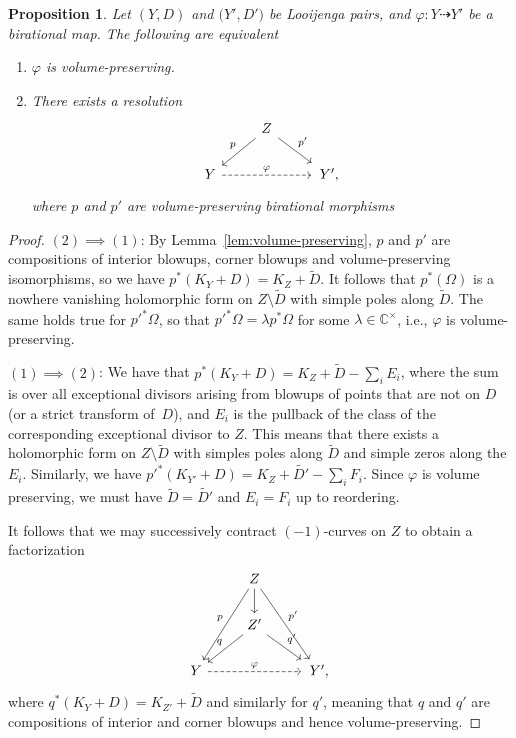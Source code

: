 \documentclass[pdftex]{sigma}
\numberwithin{equation}{section}
\newtheorem{Proposition}[Theorem]{Proposition}
{ \theoremstyle{definition}
	\newtheorem{Definition}[Theorem]{Definition}
	\newtheorem{Note}[Theorem]{Note}
	\newtheorem{Example}[Theorem]{Example}
	\newtheorem{Remark}[Theorem]{Remark} }
\newcommand{\CC}{\mathbb{C}}
\begin{document}
\begin{Proposition}\label{thm:volume-preserving}
Let $(Y, D)$ and $\bigl(Y', D'\bigr)$ be Looijenga pairs, and $\varphi \colon Y \dashrightarrow Y'$ be a birational map. The following are equivalent
	\begin{enumerate}\itemsep=0pt
		\item[$(1)$] $\varphi$ is volume-preserving.
		\item[$(2)$] There exists a resolution
				\[
				\begin{tikzcd}
			&Z \ar[dl, swap, "p"] \ar[dr, "p'"]&\\
			Y \ar[rr, dashed, "\varphi"]&&\,Y',
		\end{tikzcd}
	\]
	where $p$ and $p'$ are volume-preserving birational morphisms

	\end{enumerate}
\end{Proposition}
\begin{proof}
	$(2) \implies (1)$: By Lemma~\ref{lem:volume-preserving}, $p$ and $p'$ are compositions of interior blowups, corner blowups and volume-preserving isomorphisms, so we have $p^*(K_Y+D)=K_{Z}+\tilde{D}$. It follows that $p^*(\Omega)$ is a nowhere vanishing holomorphic form on $Z \setminus \tilde{D}$ with simple poles along $\tilde{D}$. The same holds true for $p'^*\Omega$, so that $p'^*\Omega=\lambda p^*\Omega$ for some $\lambda \in \CC^\times$, i.e., $\varphi$ is volume-preserving.

	$(1) \implies (2)$: We have that $p^*(K_Y+D)=K_Z+\tilde{D}-\sum_i E_i$, where the sum is over all exceptional divisors arising from blowups of points that are not on $D$ (or a strict transform of~$D$), and $E_i$ is the pullback of the class of the corresponding exceptional divisor to $Z$. This means that there exists a holomorphic form on $Z \setminus \tilde{D}$ with simples poles along $\tilde{D}$ and simple zeros along the $E_i$.
	Similarly, we have $p'^*(K_{Y'}+D)=K_Z+\tilde{D'}-\sum_i F_i$. Since $\varphi$ is volume preserving, we must have $\tilde{D}=\tilde{D'}$ and $E_i=F_i$ up to reordering.

	 It follows that we may successively contract $(-1)$-curves on $Z$ to obtain a factorization
	\[
	\begin{tikzcd}
		&Z \ar[ddl, swap,"p"] \ar[ddr, "p'"] \ar[d]&\\
		&Z' \ar[dl, swap,"q"] \ar[dr, "q'"]&\\
		Y \ar[rr, dashed, "\varphi"]&&\,Y',
	\end{tikzcd}
	\]
	where $q^*(K_{Y}+D)=K_{Z'}+\tilde{D}$ and similarly for $q'$, meaning that $q$ and $q'$ are compositions of interior and corner blowups and hence volume-preserving.
\end{proof}
\end{document}
